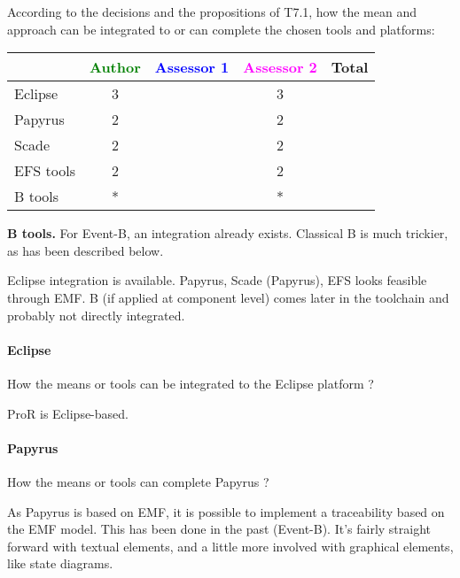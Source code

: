According to the decisions and the propositions of T7.1, how the mean and approach can be integrated to or can complete the chosen tools and platforms:

\begin{tabular}{|l | c | c | c | c|}
\hline
& \textcolor{green}{Author} & \textcolor{blue}{Assessor 1} & \textcolor{magenta}{Assessor 2} & Total \\
\hline
Eclipse & 3 & & 3 &  \\
\hline
Papyrus  & 2 & & 2 & \\
\hline
Scade & 2 & & 2 & \\
\hline
EFS tools & 2 & & 2 & \\
\hline
B tools & * & & * & \\
\hline
\end{tabular}

\begin{author_comment}
\textbf{B tools.} For Event-B, an integration already exists.  Classical B is much trickier, as has been described below.
\end{author_comment}

\begin{assessor2}
Eclipse integration is available. Papyrus, Scade (Papyrus), EFS looks feasible through EMF. B (if applied at component level) comes later in the toolchain and probably not directly integrated.
\end{assessor2}

\paragraph{Eclipse}
How the means or tools can be integrated to the Eclipse platform ?

\begin{author_comment}
ProR is Eclipse-based.
\end{author_comment}

\paragraph{Papyrus}
How the means or tools can complete  Papyrus ?

\begin{author_comment}
As Papyrus is based on EMF, it is possible to implement a traceability based on the EMF model.  This has been done in the past (Event-B).  It's fairly straight forward with textual elements, and a little more involved with graphical elements, like state diagrams.

\end{author_comment}

